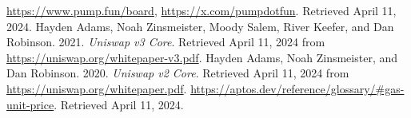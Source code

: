 \documentclass[table, twocolumn]{article}
\begin{document}
\begin{thebibliography}{2}
   \url{https://www.pump.fun/board}, \url{https://x.com/pumpdotfun}.
  Retrieved April 11, 2024.
   Hayden Adams, Noah Zinsmeister, Moody Salem, River Keefer, and Dan
  Robinson. 2021. \emph{Uniswap v3 Core}. Retrieved April 11, 2024 from
  \url{https://uniswap.org/whitepaper-v3.pdf}.
   Hayden Adams, Noah Zinsmeister, and Dan Robinson. 2020. \emph{Uniswap
    v2 Core}. Retrieved April 11, 2024 from \url{https://uniswap.org/whitepaper.pdf}.
   \url{https://aptos.dev/reference/glossary/#gas-unit-price}. Retrieved
  April 11, 2024.
\end{thebibliography}
\end{document}
